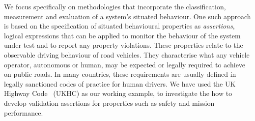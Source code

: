 We focus specifically on methodologies that incorporate the classification, measurement and evaluation of a system's situated behaviour. One such approach is based on the specification of situated behavioural properties as \emph{assertions}, logical expressions that can be applied 
to monitor the behaviour of the system under test and to report any property violations. 
%
These properties relate to the observable driving behaviour of road vehicles. They characterise what any vehicle operator, autonomous or human, %
%
%
may be expected or legally required to achieve on public roads. 
%
%
In many countries, these requirements are usually defined in legally sanctioned codes of practice for human drivers.
%
We have used the UK Highway Code~\cite{highwayCode} (UKHC) as our working example, %
to investigate the how to develop validation assertions for properties such as safety and mission performance. %


